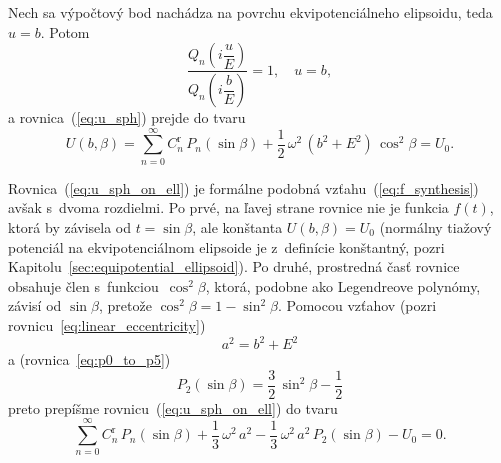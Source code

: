 \documentclass[a4paper, 12pt]{book}
\begin{document}
Nech sa výpočtový bod nachádza na povrchu ekvipotenciálneho elipsoidu, teda $u 
= b$.  Potom
%
\begin{equation}
\frac{Q_n\left( i \dfrac{u}{E} \right)}{Q_n\left( i \dfrac{b}{E} \right)} 
= 1{,} \quad u = b{,}
\end{equation}
%
a rovnica~(\ref{eq:u_sph}) prejde do tvaru
%
\begin{equation}
\label{eq:u_sph_on_ell}
U(b, \beta) = \sum_{n = 0}^\infty C^{\mathrm{r}}_n \, P_n(\sin\beta) 
+ \frac{1}{2} \, \omega^2 \, (b^2 + E^2) \, \cos^2\beta = U_0{.}
\end{equation}

Rovnica~(\ref{eq:u_sph_on_ell}) je formálne podobná 
vzťahu~(\ref{eq:f_synthesis}) avšak s~dvoma rozdielmi.  Po prvé, na ľavej 
strane rovnice nie je funkcia $f(t)$, ktorá by závisela od $t = \sin\beta$, ale 
konštanta $U(b, \beta) = U_0$ (normálny tiažový potenciál na ekvipotenciálnom 
elipsoide je z~definície konštantný, pozri 
Kapitolu~\ref{sec:equipotential_ellipsoid}).  Po druhé, prostredná časť rovnice 
obsahuje člen s~funkciou~$\cos^2\beta$, ktorá, podobne ako Legendreove 
polynómy, závisí od $\sin\beta$, pretože $\cos^2\beta = 1 - \sin^2\beta$.  
Pomocou vzťahov (pozri rovnicu~\ref{eq:linear_eccentricity})
%
\begin{equation}
a^2 = b^2 + E^2
\end{equation}
%
a (rovnica~\ref{eq:p0_to_p5})
%
\begin{equation}
P_2(\sin\beta) = \frac{3}{2} \, \sin^2\beta - \frac{1}{2}
\end{equation}
%
preto prepíšme rovnicu~(\ref{eq:u_sph_on_ell}) do tvaru
%
\begin{equation}
\label{eq:cnr}
\sum_{n = 0}^\infty C^{\mathrm{r}}_n \, P_n(\sin\beta) + \frac{1}{3} \, 
\omega^2 \, a^2  - \frac{1}{3} \, \omega^2 \, a^2 \, P_2(\sin\beta) - U_0 
= 0{.}
\end{equation}
\end{document}

